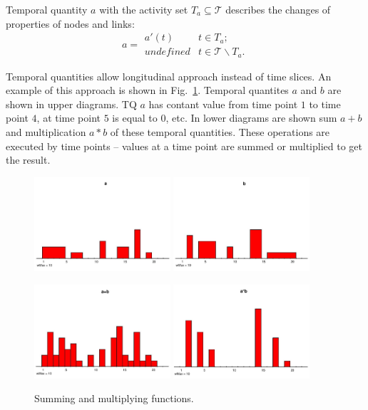 \documentclass[a4paper,twoside,10pt]{article}
\begin{document}
Temporal quantity $a$ with the activity set $T_a \subseteq \mathcal{T}$ describes the changes of properties of nodes and links:
$$
a =
\begin{array}{ll}
  a'(t) & t \in T_a; \\
  undefined & t \in \mathcal{T}\backslash T_a.
\end{array}
$$

Temporal quantities allow longitudinal approach instead of time slices. An example of this approach is shown in Fig.~\ref{functions}. Temporal quantites $a$ and $b$ are shown in upper diagrams. TQ $a$ has contant value from time point $1$ to time point $4$, at time point $5$ is equal to $0$, etc. In lower diagrams are shown sum $a+b$ and multiplication $a*b$ of these temporal quantities. These operations are executed by time points -- values at a time point are summed or multiplied to get the result.

\begin{figure}[!h]
	\centering
	\includegraphics[width=0.45\textwidth]{./pics/a-page-001.jpg}
	\includegraphics[width=0.45\textwidth]{./pics/b-page-001.jpg}

	\includegraphics[width=0.45\textwidth]{./pics/sum-page-001.jpg}
	\includegraphics[width=0.45\textwidth]{./pics/pro-page-001.jpg}
  \caption{Summing and multiplying functions.}
  \label{functions}
\end{figure}
\end{document}
